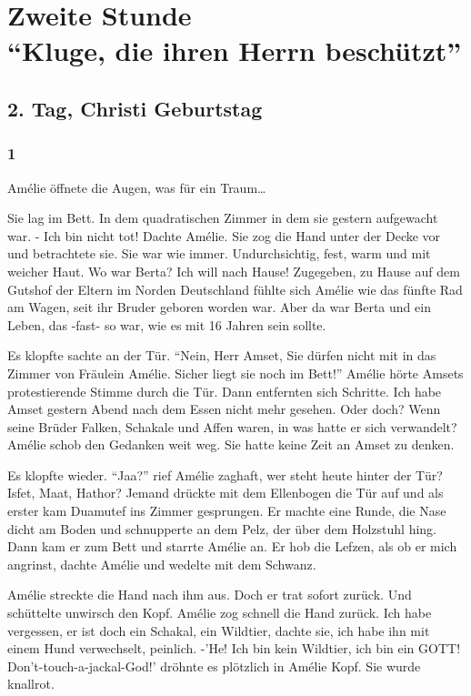 \documentclass[11pt,titlepage,a5paper]{book}
\begin{document}
\part*{Zweite Stunde\\"`Kluge, die ihren Herrn beschützt"'}

\chapter*{2. Tag, Christi Geburtstag}

\section*{1}

Amélie öffnete die Augen, was für ein Traum\dots

Sie lag im Bett. In dem quadratischen Zimmer in dem sie gestern aufgewacht war. - Ich bin nicht tot! Dachte Amélie. Sie zog die Hand unter der Decke vor und betrachtete sie. Sie war wie immer. Undurchsichtig, fest, warm und mit weicher Haut. Wo war Berta? Ich will nach Hause! Zugegeben, zu Hause auf dem Gutshof der Eltern im Norden Deutschland fühlte sich Amélie wie das fünfte Rad am Wagen, seit ihr Bruder geboren worden war. Aber da war Berta und ein Leben, das -fast- so war, wie es mit 16 Jahren sein sollte.

Es klopfte sachte an der Tür. "`Nein, Herr Amset, Sie dürfen nicht mit in das Zimmer von Fräulein Amélie. Sicher liegt sie noch im Bett!"' Amélie hörte Amsets protestierende Stimme durch die Tür. Dann entfernten sich Schritte. Ich habe Amset gestern Abend nach dem Essen nicht mehr gesehen. Oder doch? Wenn seine Brüder Falken, Schakale und Affen waren, in was hatte er sich verwandelt? Amélie schob den Gedanken weit weg. Sie hatte keine Zeit an Amset zu denken. 

Es klopfte wieder. "`Jaa?"' rief Amélie zaghaft, wer steht heute hinter der Tür? Isfet, Maat, Hathor? Jemand drückte mit dem Ellenbogen die Tür auf und als erster kam Duamutef ins Zimmer gesprungen. Er machte eine Runde, die Nase dicht am Boden und schnupperte an dem Pelz, der über dem Holzstuhl hing. Dann kam er zum Bett und starrte Amélie an. Er hob die Lefzen, als ob er mich angrinst, dachte Amélie und wedelte mit dem Schwanz. 

Amélie streckte die Hand nach ihm aus. Doch er trat sofort zurück. Und schüttelte unwirsch den Kopf. Amélie zog schnell die Hand zurück. Ich habe vergessen, er ist doch ein Schakal, ein Wildtier, dachte sie, ich habe ihn mit einem Hund verwechselt, peinlich. -'He! Ich bin kein Wildtier, ich bin ein GOTT! Don't-touch-a-jackal-God!' dröhnte es plötzlich in Amélie Kopf. Sie wurde knallrot.
\end{document}

